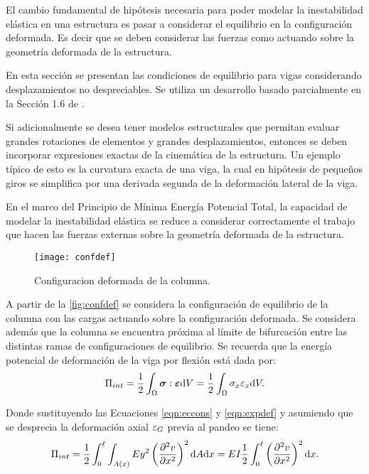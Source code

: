 El cambio fundamental de hipótesis necesaria para poder modelar la inestabilidad elástica en una estructura es pasar a considerar el equilibrio en la configuración deformada. Es decir que se deben considerar las fuerzas como actuando sobre la geometría deformada de la estructura.

En esta sección se presentan las condiciones de equilibrio para vigas considerando desplazamientos no despreciables. Se utiliza un desarrollo basado parcialmente en la Sección 1.6 de \citep{yoo2011}.

Si adicionalmente se desea tener modelos estructurales que permitan evaluar grandes rotaciones de elementos y grandes desplazamientos, entonces se deben incorporar expresiones exactas de la cinemática de la estructura. Un ejemplo típico de esto es la curvatura exacta de una viga, la cual en hipótesis de pequeños giros se simplifica por una derivada segunda de la deformación lateral de la viga.

En el marco del Principio de Mínima Energía Potencial Total, la capacidad de modelar la inestabilidad elástica se reduce a considerar correctamente el trabajo que hacen las fuerzas externas sobre la geometría deformada de la estructura.


\begin{figure}[htb]
	\centering
	\texttt{[image: confdef]}
	\caption{Configuracion deformada de la columna.}
	\label{fig:confdef}
\end{figure}

A partir de la \autoref{fig:confdef} se considera la configuración de equilibrio de la columna con las cargas actuando sobre la configuración deformada. Se considera además que la columna se encuentra próxima al límite de bifurcación entre las distintas ramas de configuraciones de equilibrio.
Se recuerda que la energía potencial de deformación de la viga por flexión está dada por:
%
\begin{equation}
\Pi_{int} = \frac{1}{2} \int_\Omega \boldsymbol{\sigma} : \boldsymbol{\varepsilon}  {\text{d}} V  = \frac{1}{2} \int_\Omega \sigma_x \varepsilon_x  {\text{d}} V. 
\end{equation}

Donde sustituyendo las Ecuaciones \eqref{eqn:eccons} y \eqref{eqn:expdef} y asumiendo que se desprecia la deformación axial $\varepsilon_G$ previa al pandeo se tiene:
%
\begin{equation}
\Pi_{int} = \frac{1}{2} \int_0^\ell \int_{A(x)} E y^2 \left( \frac{\partial^2 v}{\partial x^2}\right)^2  {\text{d}} A {\text{d}} x 
=  E I  \frac{1}{2} \int_0^\ell \left( \frac{\partial^2 v}{\partial x^2}\right)^2 {\text{d}} x.
\end{equation}

